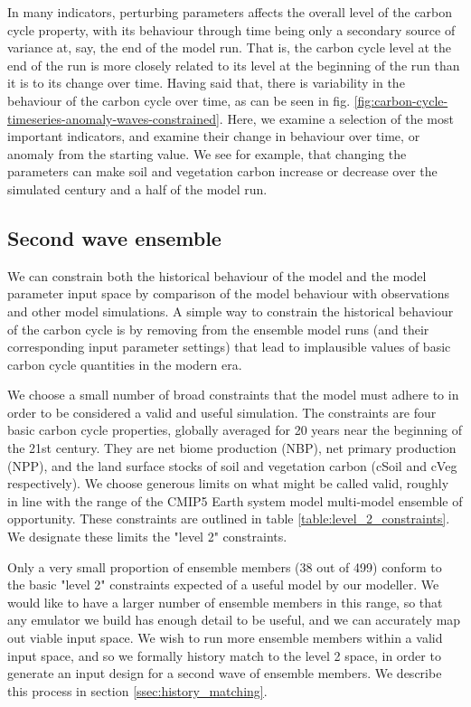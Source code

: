 \documentclass[gmd, manuscript]{copernicus}
\begin{document}
In many indicators, perturbing parameters affects the overall level of the carbon cycle property, with its behaviour through time being only a secondary source of variance at, say, the end of the model run. That is, the carbon cycle level at the end of the run is more closely related to its level at the beginning of the run than it is to its change over time. Having said that, there is variability in the behaviour of the carbon cycle over time, as can be seen in fig. \ref{fig:carbon-cycle-timeseries-anomaly-waves-constrained}. Here, we examine a selection of the most important indicators, and examine their change in behaviour over time, or anomaly from the starting value. We see for example, that changing the parameters can make soil and vegetation carbon increase or decrease over the simulated century and a half of the model run. 

\subsection{Second wave ensemble}\label{ssec:second_wave}

We can constrain both the historical behaviour of the model and the model parameter input space by comparison of the model behaviour with observations and other model simulations. A simple way to constrain the historical behaviour of the carbon cycle is by removing from the ensemble model runs (and their corresponding input parameter settings) that lead to implausible values of basic carbon cycle quantities in the modern era.

We choose a small number of broad constraints that the model must adhere to in order to be considered a valid and useful simulation. The constraints are four basic carbon cycle properties, globally averaged for 20 years near the beginning of the 21st century. They are net biome production (NBP), net primary production (NPP), and the land surface stocks of soil and vegetation carbon (cSoil and cVeg respectively). We choose generous limits on what might be called valid, roughly in line with the range of the CMIP5 Earth system model multi-model ensemble of opportunity. These constraints are outlined in table \ref{table:level_2_constraints}. We designate these limits the "level 2" constraints.

Only a very small proportion of ensemble members (38 out of 499) conform to the basic "level 2" constraints expected of a useful model by our modeller. We would like to have a larger number of ensemble members in this range, so that any emulator we build has enough detail to be useful, and we can accurately map out viable input space. We wish to run more ensemble members within a valid input space, and so we formally history match to the level 2 space, in order to generate an input design for a second wave of ensemble members. We describe this process in section \ref{ssec:history_matching}.
\end{document}
